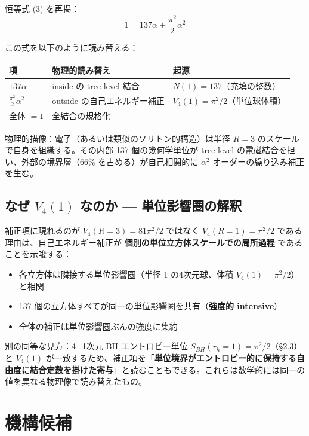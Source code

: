 \documentclass[a4paper,11pt]{ltjsarticle}
\begin{document}
恒等式 (3) を再掲：
\[ 1 = 137 \alpha + \frac{\pi^2}{2} \alpha^2 \]

この式を以下のように読み替える：

\begin{center}
\begin{tabular}{lll}
\toprule
項 & 物理的読み替え & 起源 \\
\midrule
$137 \alpha$ & inside の tree-level 結合 & $N(1) = 137$（充填の整数） \\
$\frac{\pi^2}{2} \alpha^2$ & outside の自己エネルギー補正 & $V_4(1) = \pi^2/2$（単位球体積） \\
全体 $= 1$ & 全結合の規格化 & --- \\
\bottomrule
\end{tabular}
\end{center}

物理的描像：電子（あるいは類似のソリトン的構造）は半径 $R=3$ のスケールで自身を組織する。その内部 137 個の幾何学単位が tree-level の電磁結合を担い、外部の境界層（66\% を占める）が自己相関的に $\alpha^2$ オーダーの繰り込み補正を生む。

\subsection{なぜ $V_4(1)$ なのか --- 単位影響圏の解釈}

補正項に現れるのが $V_4(R=3) = 81\pi^2/2$ ではなく $V_4(R=1) = \pi^2/2$ である理由は、自己エネルギー補正が \textbf{個別の単位立方体スケールでの局所過程} であることを示唆する：

\begin{itemize}
\item 各立方体は隣接する単位影響圏（半径 1 の4次元球、体積 $V_4(1) = \pi^2/2$）と相関
\item 137 個の立方体すべてが同一の単位影響圏を共有（\textbf{強度的 intensive}）
\item 全体の補正は単位影響圏ぶんの強度に集約
\end{itemize}

別の同等な見方：4+1次元 BH エントロピー単位 $S_{BH}(r_h=1) = \pi^2/2$（§2.3）と $V_4(1)$ が一致するため、補正項を「\textbf{単位境界がエントロピー的に保持する自由度に結合定数を掛けた寄与}」と読むこともできる。これらは数学的には同一の値を異なる物理像で読み替えたもの。

\section{機構候補}
\end{document}
